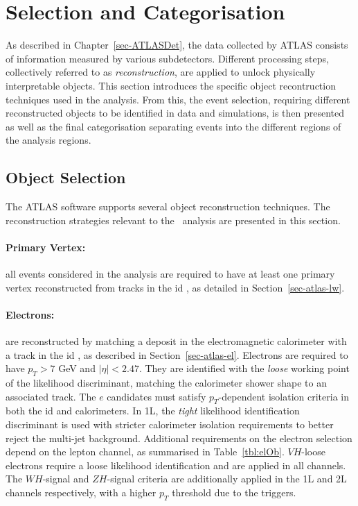 
\section{Selection and Categorisation}\label{sec-selectionandcat}
As described in Chapter~\ref{sec-ATLASDet}, the data collected by ATLAS consists of information measured by various subdetectors. Different processing steps, collectively referred to as \textit{reconstruction}, are applied to unlock physically interpretable objects. This section introduces the specific object recontruction techniques used in the analysis. From this, the event selection, requiring different reconstructed objects to be identified in data and simulations, is then presented as well as the final categorisation separating events into the different regions of the analysis regions.

\subsection{Object Selection}\label{sec-obj}
The ATLAS software supports several object reconstruction techniques. The reconstruction strategies relevant to the \vhbc\ analysis are presented in this section. 

\paragraph{Primary Vertex:} all events considered in the analysis are required to have at least one primary vertex reconstructed from tracks in the \gls{id} \cite{ATL-PHYS-PUB-2015-026}, as detailed in Section~\ref{sec-atlas-lw}.

\paragraph{Electrons:} are reconstructed by matching a deposit in the electromagnetic calorimeter with a track in the \gls{id} \cite{Aaboud:2657964, Aad_2019}, as described in Section~\ref{sec-atlas-el}. Electrons are required to have $p_T > 7$ GeV and $|\eta|<2.47$. They are identified with the \textit{loose} working point of the likelihood discriminant, matching the calorimeter shower shape to an associated track. The $e$ candidates must satisfy $p_T$-dependent isolation criteria in both the \gls{id} and calorimeters. In 1L, the \textit{tight} likelihood identification discriminant is used with stricter calorimeter isolation requirements to better reject the multi-jet background. Additional requirements on the electron selection depend on the lepton channel, as summarised in Table~\ref{tbl:elOb}. $VH$-loose electrons require a loose likelihood identification and are applied in all channels. The $WH$-signal and $ZH$-signal criteria are additionally applied in the 1L and 2L channels respectively, with a higher $p_T$ threshold due to the triggers. 


